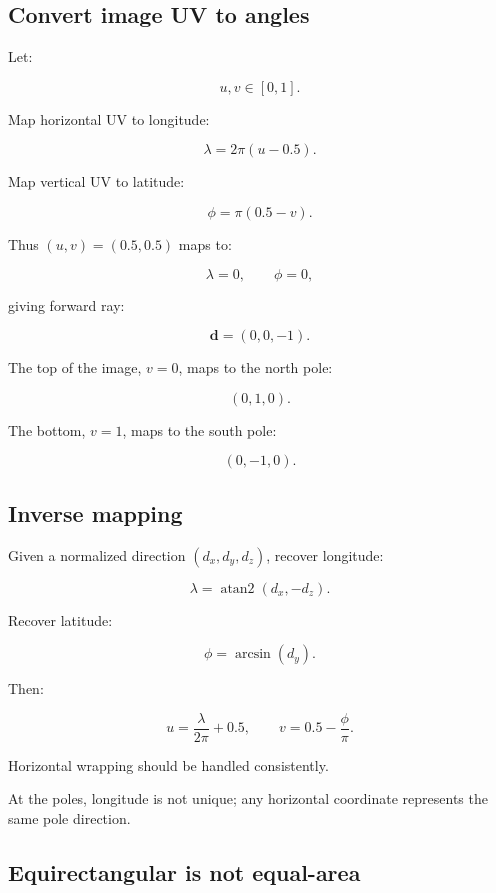 \subsection{Convert image UV to angles}\label{02-foundations-ii-ch035-convert-image-uv-to-angles}

Let:

\[ u,v\in[0,1]. \]

Map horizontal UV to longitude:

\[ \boxed{ \lambda=2\pi(u-0.5). } \]

Map vertical UV to latitude:

\[ \boxed{ \phi=\pi(0.5-v). } \]

Thus \((u,v)=(0.5,0.5)\) maps to:

\[ \lambda=0,\qquad\phi=0, \]

giving forward ray:

\[ \boxed{\mathbf d=(0,0,-1)}. \]

The top of the image, \(v=0\), maps to the north pole:

\[ (0,1,0). \]

The bottom, \(v=1\), maps to the south pole:

\[ (0,-1,0). \]

\subsection{Inverse mapping}\label{02-foundations-ii-ch035-inverse-mapping}

Given a normalized direction \((d_x,d_y,d_z)\), recover longitude:

\[ \boxed{ \lambda=\operatorname{atan2}(d_x,-d_z). } \]

Recover latitude:

\[ \boxed{ \phi=\arcsin(d_y). } \]

Then:

\[ \boxed{ u=\frac{\lambda}{2\pi}+0.5, \qquad v=0.5-\frac{\phi}{\pi}. } \]

Horizontal wrapping should be handled consistently.

At the poles, longitude is not unique; any horizontal coordinate represents the same pole direction.

\subsection{Equirectangular is not equal-area}\label{02-foundations-ii-ch035-equirectangular-is-not-equal-area}

